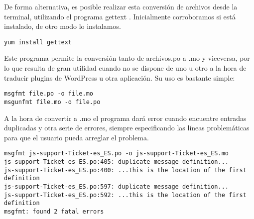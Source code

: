 De forma alternativa, es posible realizar esta conversión de archivos desde la terminal, utilizando el programa gettext \cite{mo2po}. Inicialmente corroboramos si está instalado, de otro modo lo instalamos.
\begin{lstlisting} 
yum install gettext
\end{lstlisting}
Este programa permite la conversión tanto de archivos.po a .mo y viceversa, por lo que resulta de gran utilidad cuando no se dispone de uno u otro a la hora de traducir plugins de WordPress u otra aplicación. Su uso es bastante simple:
\begin{lstlisting} 
msgfmt file.po -o file.mo
msgunfmt file.mo -o file.po
\end{lstlisting}
A la hora de convertir a .mo el programa dará error cuando encuentre entradas duplicadas y otra serie de errores, siempre especificando las líneas problemáticas para que el usuario pueda arreglar el problema.
\begin{lstlisting} 
msgfmt js-support-Ticket-es_ES.po -o js-support-Ticket-es_ES.mo
js-support-Ticket-es_ES.po:405: duplicate message definition...
js-support-Ticket-es_ES.po:400: ...this is the location of the first definition
js-support-Ticket-es_ES.po:597: duplicate message definition...
js-support-Ticket-es_ES.po:592: ...this is the location of the first definition
msgfmt: found 2 fatal errors
\end{lstlisting}
